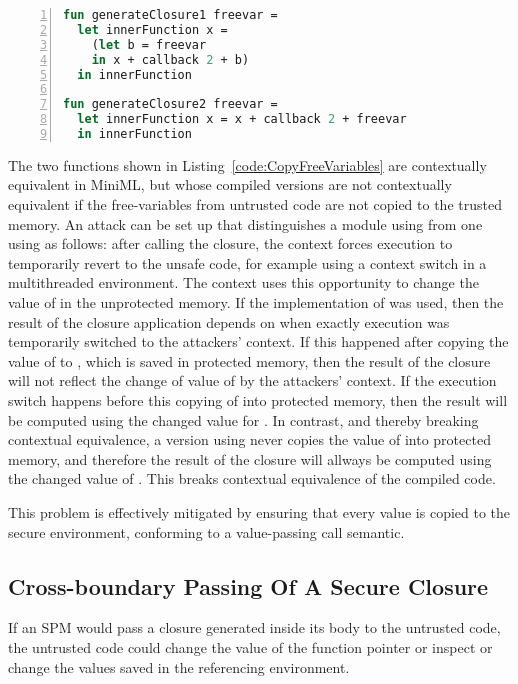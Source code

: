 \documentclass[10pt,a4paper]{report}
\begin{document}
\begin{lstlisting}[frame=single, language=ML,caption=Changing Free-Variables inside untrusted memory mid-execution can break contextual equivalence., label=code:CopyFreeVariables,numbers=left]
fun generateClosure1 freevar =
  let innerFunction x =
    (let b = freevar
    in x + callback 2 + b)
  in innerFunction

fun generateClosure2 freevar = 
  let innerFunction x = x + callback 2 + freevar
  in innerFunction
\end{lstlisting}
\label{code:CopyFreeVariables}

The two functions shown in Listing~\ref{code:CopyFreeVariables} are contextually equivalent in \mbox{MiniML}, but whose compiled versions are not contextually equivalent if the free-variables from untrusted code are not copied to the trusted memory. An attack can be set up that distinguishes a module using  from one using  as follows: after calling the closure, the context forces execution to temporarily revert to the unsafe code, for example using a context switch in a multithreaded environment. The context uses this opportunity to change the value of  in the unprotected memory. If the implementation of  was used, then the result of the closure application depends on when exactly execution was temporarily switched to the attackers' context. If this happened after copying the value of  to , which is saved in protected memory, then the result of the closure will not reflect the change of value of  by the attackers' context. If the execution switch happens before this copying of  into protected memory, then the result will be computed using the changed value for .
In contrast, and thereby breaking contextual equivalence, a version using   never copies the value of  into protected memory, and therefore the result of the closure will allways be computed using the changed value of . This breaks contextual equivalence of the compiled code.

This problem is effectively mitigated by ensuring that every value is copied to the secure environment, conforming to a value-passing call semantic.


\subsection{Cross-boundary Passing Of A Secure Closure }
If an SPM would pass a closure generated inside its body to the untrusted code, the untrusted code could change the value of the function pointer or inspect or change the values saved in the referencing environment.
\end{document}
